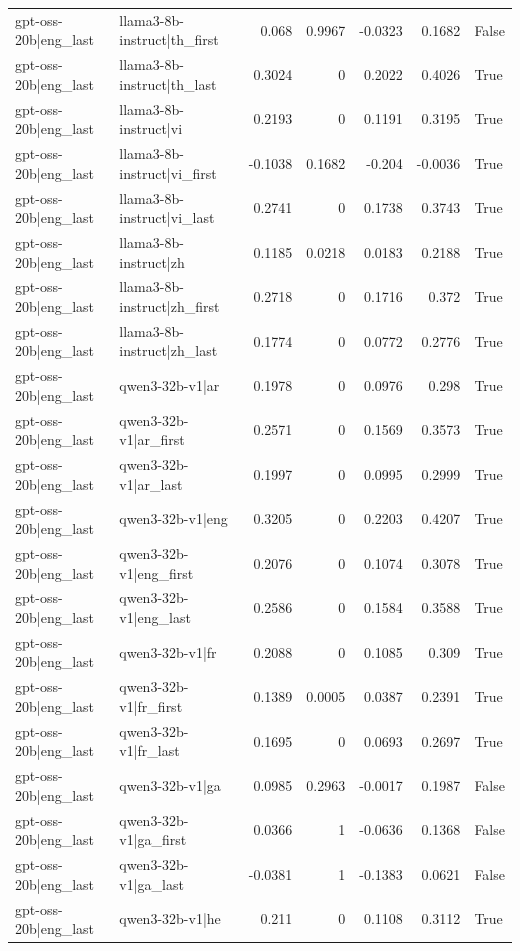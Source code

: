 \begin{table}
\begin{tabular}{l l r r r r l}
gpt-oss-20b|eng_last & llama3-8b-instruct|th_first & 0.068 & 0.9967 & -0.0323 & 0.1682 & False \\
gpt-oss-20b|eng_last & llama3-8b-instruct|th_last & 0.3024 & 0 & 0.2022 & 0.4026 & True \\
gpt-oss-20b|eng_last & llama3-8b-instruct|vi & 0.2193 & 0 & 0.1191 & 0.3195 & True \\
gpt-oss-20b|eng_last & llama3-8b-instruct|vi_first & -0.1038 & 0.1682 & -0.204 & -0.0036 & True \\
gpt-oss-20b|eng_last & llama3-8b-instruct|vi_last & 0.2741 & 0 & 0.1738 & 0.3743 & True \\
gpt-oss-20b|eng_last & llama3-8b-instruct|zh & 0.1185 & 0.0218 & 0.0183 & 0.2188 & True \\
gpt-oss-20b|eng_last & llama3-8b-instruct|zh_first & 0.2718 & 0 & 0.1716 & 0.372 & True \\
gpt-oss-20b|eng_last & llama3-8b-instruct|zh_last & 0.1774 & 0 & 0.0772 & 0.2776 & True \\
gpt-oss-20b|eng_last & qwen3-32b-v1|ar & 0.1978 & 0 & 0.0976 & 0.298 & True \\
gpt-oss-20b|eng_last & qwen3-32b-v1|ar_first & 0.2571 & 0 & 0.1569 & 0.3573 & True \\
gpt-oss-20b|eng_last & qwen3-32b-v1|ar_last & 0.1997 & 0 & 0.0995 & 0.2999 & True \\
gpt-oss-20b|eng_last & qwen3-32b-v1|eng & 0.3205 & 0 & 0.2203 & 0.4207 & True \\
gpt-oss-20b|eng_last & qwen3-32b-v1|eng_first & 0.2076 & 0 & 0.1074 & 0.3078 & True \\
gpt-oss-20b|eng_last & qwen3-32b-v1|eng_last & 0.2586 & 0 & 0.1584 & 0.3588 & True \\
gpt-oss-20b|eng_last & qwen3-32b-v1|fr & 0.2088 & 0 & 0.1085 & 0.309 & True \\
gpt-oss-20b|eng_last & qwen3-32b-v1|fr_first & 0.1389 & 0.0005 & 0.0387 & 0.2391 & True \\
gpt-oss-20b|eng_last & qwen3-32b-v1|fr_last & 0.1695 & 0 & 0.0693 & 0.2697 & True \\
gpt-oss-20b|eng_last & qwen3-32b-v1|ga & 0.0985 & 0.2963 & -0.0017 & 0.1987 & False \\
gpt-oss-20b|eng_last & qwen3-32b-v1|ga_first & 0.0366 & 1 & -0.0636 & 0.1368 & False \\
gpt-oss-20b|eng_last & qwen3-32b-v1|ga_last & -0.0381 & 1 & -0.1383 & 0.0621 & False \\
gpt-oss-20b|eng_last & qwen3-32b-v1|he & 0.211 & 0 & 0.1108 & 0.3112 & True \\

\end{tabular}
\end{table}
